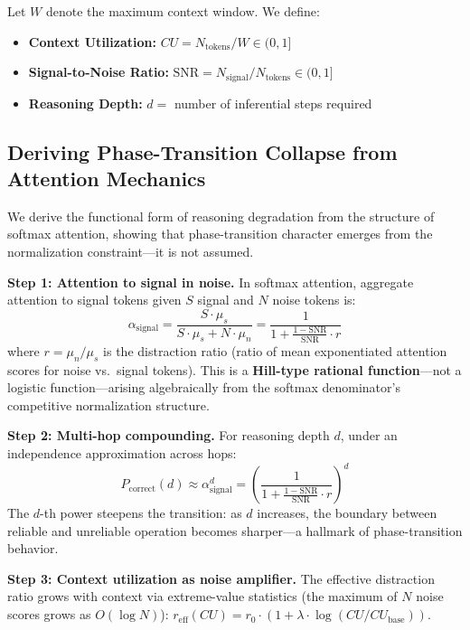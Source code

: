 \documentclass{article}
\begin{document}
Let $W$ denote the maximum context window. We define:
\begin{itemize}
    \item \textbf{Context Utilization:} $CU = N_{\text{tokens}} / W \in (0, 1]$
    \item \textbf{Signal-to-Noise Ratio:} $\mathrm{SNR} = N_{\text{signal}} / N_{\text{tokens}} \in (0, 1]$
    \item \textbf{Reasoning Depth:} $d =$ number of inferential steps required
\end{itemize}

\subsection{Deriving Phase-Transition Collapse from Attention Mechanics}
\label{sec:derivation}

We derive the functional form of reasoning degradation from the structure of softmax attention, showing that phase-transition character emerges from the normalization constraint---it is not assumed.

\textbf{Step 1: Attention to signal in noise.}
In softmax attention, aggregate attention to signal tokens given $S$ signal and $N$ noise tokens is:
\begin{equation}
\alpha_{\text{signal}} = \frac{S \cdot \mu_s}{S \cdot \mu_s + N \cdot \mu_n} = \frac{1}{1 + \frac{1 - \mathrm{SNR}}{\mathrm{SNR}} \cdot r}
\label{eq:alpha_signal}
\end{equation}
where $r = \mu_n / \mu_s$ is the distraction ratio (ratio of mean exponentiated attention scores for noise vs.\ signal tokens). This is a \textbf{Hill-type rational function}---not a logistic function---arising algebraically from the softmax denominator's competitive normalization structure.

\textbf{Step 2: Multi-hop compounding.}
For reasoning depth $d$, under an independence approximation across hops:
\begin{equation}
P_{\text{correct}}(d) \approx \alpha_{\text{signal}}^d = \left(\frac{1}{1 + \frac{1-\mathrm{SNR}}{\mathrm{SNR}} \cdot r}\right)^d
\label{eq:multihop}
\end{equation}
The $d$-th power steepens the transition: as $d$ increases, the boundary between reliable and unreliable operation becomes sharper---a hallmark of phase-transition behavior.

\textbf{Step 3: Context utilization as noise amplifier.}
The effective distraction ratio grows with context via extreme-value statistics (the maximum of $N$ noise scores grows as $O(\log N)$):
$r_{\text{eff}}(CU) = r_0 \cdot (1 + \lambda \cdot \log(CU / CU_{\text{base}}))$.
\end{document}
